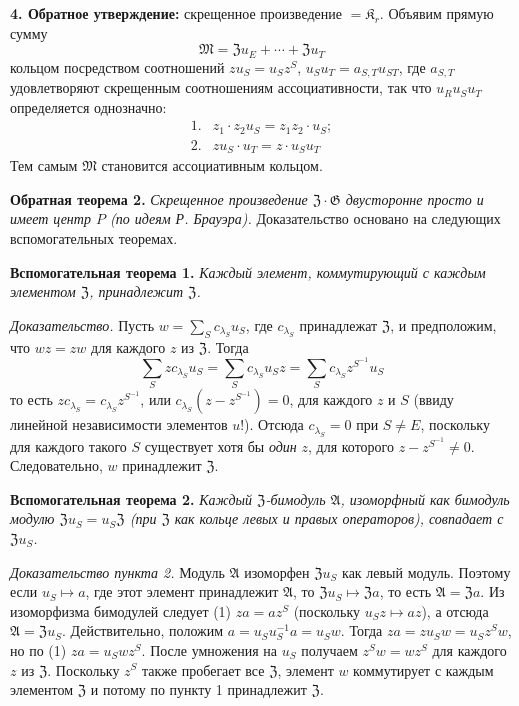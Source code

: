 \documentclass[11pt]{article}
\begin{document}
\noindent\textbf{4. Обратное утверждение:} скрещенное произведение \(=\mathfrak K_r\). Объявим прямую сумму
\[
\mathfrak M=\mathfrak Zu_E+\cdots+\mathfrak Zu_T
\]
кольцом посредством соотношений \(zu_S=u_Sz^S\), \(u_Su_T=a_{S,T}u_{ST}\), где \(a_{S,T}\) удовлетворяют скрещенным соотношениям ассоциативности, так что \(u_Ru_Su_T\) определяется однозначно:
\[
\begin{array}{ll}
1.&z_1\cdot z_2u_S=z_1z_2\cdot u_S;\\[2pt]
2.&zu_S\cdot u_T=z\cdot u_Su_T
\end{array}
\]
Тем самым \(\mathfrak M\) становится ассоциативным кольцом.

\noindent\textbf{Обратная теорема 2.} \emph{Скрещенное произведение \(\mathfrak Z\cdot\mathfrak G\) двусторонне просто и имеет центр \(P\) (по идеям Р. Брауэра).} Доказательство основано на следующих вспомогательных теоремах.

\noindent\textbf{Вспомогательная теорема 1.} \emph{Каждый элемент, коммутирующий с каждым элементом \(\mathfrak Z\), принадлежит \(\mathfrak Z\).}

\noindent\emph{Доказательство.} Пусть \(w=\sum_S c_{\lambda_S}u_S\), где \(c_{\lambda_S}\) принадлежат \(\mathfrak Z\), и предположим, что \(wz=zw\) для каждого \(z\) из \(\mathfrak Z\). Тогда
\[
\sum_S zc_{\lambda_S}u_S
 =\sum_S c_{\lambda_S}u_Sz
 =\sum_S c_{\lambda_S}z^{S^{-1}}u_S
\]
то есть \(zc_{\lambda_S}=c_{\lambda_S}z^{S^{-1}}\), или \(c_{\lambda_S}(z-z^{S^{-1}})=0\), для каждого \(z\) и \(S\) (ввиду линейной независимости элементов \(u\)!). Отсюда \(c_{\lambda_S}=0\) при \(S\neq E\), поскольку для каждого такого \(S\) существует хотя бы \emph{один} \(z\), для которого \(z-z^{S^{-1}}\neq0\). Следовательно, \(w\) принадлежит \(\mathfrak Z\).

\noindent\textbf{Вспомогательная теорема 2.} \emph{Каждый \(\mathfrak Z\)-бимодуль \(\mathfrak A\), изоморфный как бимодуль модулю \(\mathfrak Zu_S=u_S\mathfrak Z\) (при \(\mathfrak Z\) как кольце левых и правых операторов), совпадает с \(\mathfrak Zu_S\).}

\noindent\emph{Доказательство пункта 2.} Модуль \(\mathfrak A\) изоморфен \(\mathfrak Zu_S\) как левый модуль. Поэтому если \(u_S\mapsto a\), где этот элемент принадлежит \(\mathfrak A\), то \(\mathfrak Zu_S\mapsto\mathfrak Za\), то есть \(\mathfrak A=\mathfrak Za\). Из изоморфизма бимодулей следует (1) \(za=az^S\) (поскольку \(u_Sz\mapsto az\)), а отсюда \(\mathfrak A=\mathfrak Zu_S\). Действительно, положим \(a=u_Su_S^{-1}a=u_Sw\). Тогда \(za=zu_Sw=u_Sz^Sw\), но по (1) \(za=u_Swz^S\). После умножения на \(u_S\) получаем \(z^Sw=wz^S\) для каждого \(z\) из \(\mathfrak Z\). Поскольку \(z^S\) также пробегает все \(\mathfrak Z\), элемент \(w\) коммутирует с каждым элементом \(\mathfrak Z\) и потому по пункту 1 принадлежит \(\mathfrak Z\).
\end{document}
